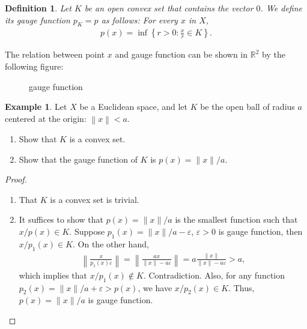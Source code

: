 \documentclass[11pt]{book}
\newtheorem{definition}{Definition}[chapter]
\theoremstyle{definition}
\newtheorem{example}{Example}[chapter]
\numberwithin{equation}{chapter}
\begin{document}
\medskip

\begin{definition}\label{gauge_function_def}
Let $K$ be an open convex set that contains the vector $0$. We define its gauge function $p_K = p$ as follows: For every $x$ in $X$, 
\begin{align*}
    p(x) = \inf \left\{r > 0 : \frac{x}{r} \in K\right\}.
\end{align*}
\end{definition}
The relation between point $x$ and gauge function can be shown in $\mathbb{R}^2$ by the following figure: \\
\begin{figure}[h]
    \centering
    \caption{gauge function}
    \label{fig:plot_3}
\end{figure}

\medskip

\begin{example}
Let $X$ be a Euclidean space, and let $K$ be the open ball of radius $a$ centered at the origin: $\left\|x\right\| < a$.
\begin{enumerate}[label=(\arabic*)]
    \item Show that $K$ is a convex set.
    
    \item Show that the gauge function of $K$ is $p(x) = \|x\|/a$.
\end{enumerate}
\end{example}
\begin{proof}
~\begin{enumerate}[label=(\arabic*)]
    \item That $K$ is a convex set is trivial.
    
    \item It suffices to show that $p(x) = \|x\|/a$ is the smallest function such that $x/p(x) \in K$. Suppose $p_1(x) = \|x\|/a - \varepsilon$, $\varepsilon > 0$ is gauge function, then $x/p_1(x) \in K$. On the other hand,
    \begin{align*}
        \left\|\frac{x}{p_1(x) \varepsilon} \right\| = \left\|\frac{ax}{\|x\| - a \varepsilon} \right\| = a \frac{\|x\|}{\|x\| - a \varepsilon} > a,
    \end{align*}
    which implies that $x/p_1(x) \notin K$. Contradiction. 
    Also, for any function $p_2(x) = \|x\|/a + \varepsilon > p(x)$, we have $x/p_2(x) \in K$. Thus, $p(x) = \|x\|/a$ is gauge function.
\end{enumerate}
\end{proof}
\end{document}
